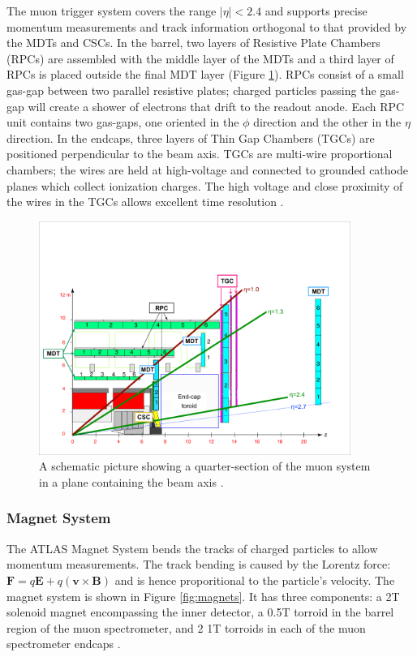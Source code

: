 The muon trigger system covers the range $|\eta|<2.4$ and supports precise momentum measurements and track information orthogonal to that provided by the MDTs and CSCs. In the barrel, two layers of Resistive Plate Chambers (RPCs) are assembled with the middle layer of the MDTs and a third layer of RPCs is placed outside the final MDT layer (Figure \ref{fig:muon_schem}). RPCs consist of a small gas-gap between two parallel resistive plates; charged particles passing the gas-gap will create a shower of electrons that drift to the readout anode. Each RPC unit contains two gas-gaps, one oriented in the $\phi$ direction and the other in the $\eta$ direction. In the endcaps, three layers of Thin Gap Chambers (TGCs) are positioned perpendicular to the beam axis. TGCs are multi-wire proportional chambers; the wires are held at high-voltage and connected to grounded cathode planes which collect ionization charges. The high voltage and close proximity of the wires in the TGCs allows excellent time resolution \cite{muon_tdr}.\\ 

\begin{figure}[h]
    \centering
    \includegraphics[width=4in]{figures/chapter2/muon_schem.png}
    \caption{A schematic picture showing a quarter-section of the muon system in a plane containing the beam axis \cite{muon_run2}.}
    \label{fig:muon_schem}
\end{figure}

\subsubsection{Magnet System}
The ATLAS Magnet System bends the tracks of charged particles to allow momentum measurements. The track bending is caused by the Lorentz force:  $\textbf{F}=q\textbf{E}+q(\textbf{v}\times\textbf{B})$ and is hence proporitional to the particle's velocity. The magnet system is shown in Figure \ref{fig:magnets}. It has three components: a 2T solenoid magnet encompassing the inner detector, a 0.5T torroid in the barrel region of the muon spectrometer, and 2 1T torroids in each of the muon spectrometer endcaps \cite{magnet_tdr}.\\

